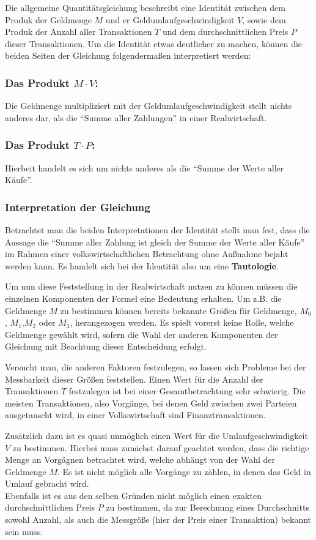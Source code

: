 Die allgemeine Quantitätsgleichung beschreibt eine Identität zwischen dem Produk der Geldmenge $M$ und er Geldumlaufgeschwindigkeit $V$, sowie dem Produk der Anzahl aller Transaktionen $T$ und dem durchschnittlichen Preis $P$ dieser Transaktionen. Um die Identität etwas deutlicher zu machen, können die beiden Seiten der Gleichung folgendermaßen interpretiert werden:

\subsubsection*{Das Produkt $M \cdot V$:}
Die Geldmenge multipliziert mit der Geldumlaufgeschwindigkeit stellt nichts anderes dar, als die \enquote{Summe aller Zahlungen} in einer Realwirtschaft.

\subsubsection*{Das Produkt $T \cdot P$:}
Hierbeit handelt es sich um nichts anderes als die \enquote{Summe der Werte aller Käufe}.

\subsubsection*{Interpretation der Gleichung}
Betrachtet man die beiden Interpretationen der Identität stellt man fest, dass die Aussage die \enquote{Summe aller Zahlung ist gleich der Summe der Werte aller Käufe} im Rahmen einer volkswirtschaftlichen Betrachtung ohne Außnahme bejaht werden kann. Es handelt sich bei der Identität also um eine \textbf{Tautologie}.

Um nun diese Feststellung in der Realwirtschaft nutzen zu können müssen die einzelnen Komponenten der Formel eine Bedeutung erhalten. Um z.B. die Geldmenge $M$ zu bestimmen können bereits bekannte Größen für Geldmenge, $M_0$, $M_1$,$M_2$ oder $M_3$, herangezogen werden. Es spielt vorerst keine Rolle, welche Geldmenge gewählt wird, sofern die Wahl der anderen Komponenten der Gleichung mit Beachtung dieser Entscheidung erfolgt.

Versucht man, die anderen Faktoren festzulegen, so lassen sich Probleme bei der Messbarkeit dieser Größen feststellen. Einen Wert für die Anzahl der Transaktionen $T$ festzulegen ist bei einer Gesamtbetrachtung sehr schwierig. Die meisten Transaktionen, also Vorgänge, bei denen Geld zwischen zwei Parteien ausgetauscht wird, in einer Volkswirtschaft sind Finanztransaktionen.

Zusätzlich dazu ist es quasi unmöglich einen Wert für die Umlaufgeschwindigkeit $V$ zu bestimmen. Hierbei muss zunächst darauf geachtet werden, dass die richtige Menge an Vorgägnen betrachtet wird, welche abhängt von der Wahl der Geldmenge $M$. Es ist nicht möglich alle Vorgänge zu zählen, in denen das Geld in Umlauf gebracht wird.\\
Ebenfalls ist es aus den selben Gründen nicht möglich einen exakten durchschnittlichen Preis $P$ zu bestimmen, da zur Berechnung eines Durchschnitts sowohl Anzahl, als auch die Messgröße (hier der Preis einer Transaktion) bekannt sein muss.

